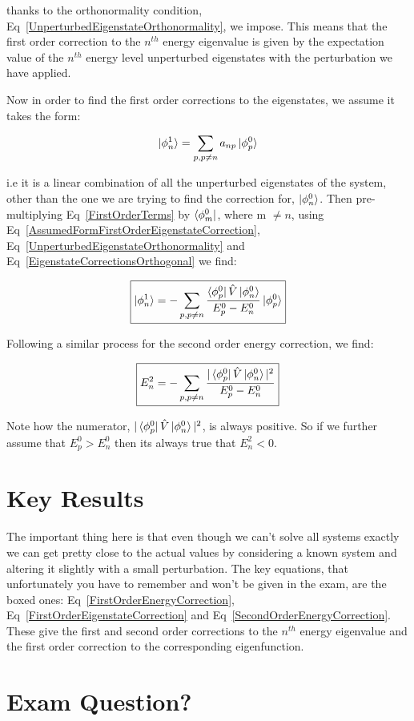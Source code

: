 \noindent thanks to the orthonormality condition, Eq~\ref{UnperturbedEigenstateOrthonormality}, we impose. This means that the first order correction to the $n^{th}$ energy eigenvalue is given by the expectation value of the $n^{th}$ energy level unperturbed eigenstates with the perturbation we have applied.

\noindent Now in order to find the first order corrections to the eigenstates, we assume it takes the form:

\begin{equation}
    \ket{\phi^1_n} = \sum_{p, p \neq n} a_{np} \ket{\phi^0_p}
    \label{AssumedFormFirstOrderEigenstateCorrection}
\end{equation}

\noindent i.e it is a linear combination of all the unperturbed eigenstates of the system, other than the one we are trying to find the correction for, $\ket{\phi^0_n}$. Then pre-multiplying Eq~\ref{FirstOrderTerms} by $\bra{\phi^0_m}$, where m $\neq n$, using Eq~\ref{AssumedFormFirstOrderEigenstateCorrection}, Eq~\ref{UnperturbedEigenstateOrthonormality} and Eq~\ref{EigenstateCorrectionsOrthogonal} we find:

\begin{equation}
    \boxed{\ket{\phi^1_n} = - \sum_{p, p \neq n} \frac{\bra{\phi^0_p}  \Hat{V}  \ket{\phi^0_n}}{{E^0_p - E^0_n}} \ket{\phi^0_p}}
    \label{FirstOrderEigenstateCorrection}
\end{equation}

\noindent Following a similar process for the second order energy correction, we find:

\begin{equation}
    \boxed{E^2_n = - \sum_{p, p \neq n} \frac{|\bra{\phi^0_p}  \Hat{V}  \ket{\phi^0_n}|^2}{{E^0_p - E^0_n}}}
    \label{SecondOrderEnergyCorrection}
\end{equation}

\noindent Note how the numerator, $|\bra{\phi^0_p}  \Hat{V}  \ket{\phi^0_n}|^2$, is always positive. So if we further assume that $E^0_p > E^0_n$ then its always true that $E^2_n < 0$.

\section{Key Results}

The important thing here is that even though we can't solve all systems exactly we can get pretty close to the actual values by considering a known system and altering it slightly with a small perturbation. The key equations, that unfortunately you have to remember and won't be given in the exam, are the boxed ones: Eq~\ref{FirstOrderEnergyCorrection}, Eq~\ref{FirstOrderEigenstateCorrection} and Eq~\ref{SecondOrderEnergyCorrection}. These give the first and second order corrections to the $n^{th}$ energy eigenvalue and the first order correction to the corresponding eigenfunction.


\section{Exam Question?}




